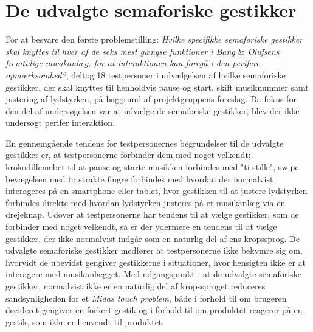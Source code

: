 \section{De udvalgte semaforiske gestikker}
\label{DiskussionUdvalgteGestikker}
%
For at besvare den første problemstilling: \textit{Hvilke specifikke semaforiske gestikker skal knyttes til hver af de seks mest gængse funktioner i Bang $\&$ Olufsens fremtidige musikanlæg, for at interaktionen kan foregå i den perifere opmærksomhed?}, deltog 18 testpersoner i udvælgelsen af hvilke semaforiske gestikker, der skal knyttes til henholdvis pause og start, skift musiknummer samt justering af lydstyrken, på baggrund af projektgruppens foreslag. Da fokus for den del af undersøgelsen var at udvælge de semaforiske gestikker, blev der ikke undersøgt perifer interaktion. 

En gennemgående tendens for testpersonernes begrundelser til de udvalgte gestikker er, at testpersonerne forbinder dem med noget velkendt; krokodillenæbet til at pause og starte musikken forbindes med "ti stille", swipe-bevægelsen med to strakte fingre forbindes med hvordan der normalvist interageres på en smartphone eller tablet, hvor gestikken til at justere lydstyrken forbindes direkte med hvordan lydstyrken justeres på et musikanlæg via en drejeknap. Udover at testpersonerne har tendens til at vælge gestikker, som de forbinder med noget velkendt, så er der ydermere en tendens til at vælge gestikker, der ikke normalvist indgår som en naturlig del af ens kropssprog. De udvalgte semaforiske gestikker medfører at testpersonerne ikke bekymre sig om, hvorvidt de ubevidst gengiver gestikkerne i situationer, hvor hensigten ikke er at interagere med musikanlægget. Med udgangspunkt i at de udvalgte semaforiske gestikker, normalvist ikke er en naturlig del af kropssproget reduceres sandsynligheden for et \textit{Midas touch problem}, både i forhold til om brugeren decideret gengiver en forkert gestik og i forhold til om produktet reagerer på en gestik, som ikke er henvendt til produktet. 

